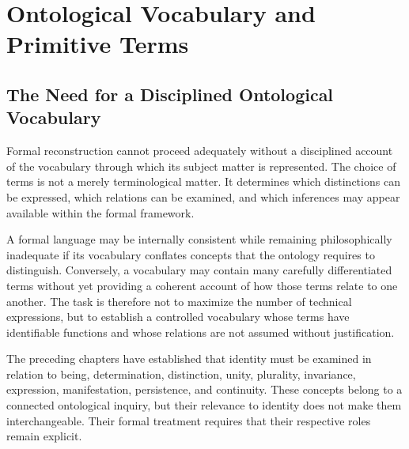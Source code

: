 
\section{Ontological Vocabulary and Primitive Terms}
\label{sec:ch07_s02}

\subsection{The Need for a Disciplined Ontological Vocabulary}

Formal reconstruction cannot proceed adequately without a
disciplined account of the vocabulary through which its subject
matter is represented. The choice of terms is not a merely
terminological matter. It determines which distinctions can be
expressed, which relations can be examined, and which inferences
may appear available within the formal framework.

A formal language may be internally consistent while remaining
philosophically inadequate if its vocabulary conflates concepts
that the ontology requires to distinguish. Conversely, a
vocabulary may contain many carefully differentiated terms
without yet providing a coherent account of how those terms
relate to one another. The task is therefore not to maximize
the number of technical expressions, but to establish a
controlled vocabulary whose terms have identifiable functions
and whose relations are not assumed without justification.

The preceding chapters have established that identity must be
examined in relation to being, determination, distinction,
unity, plurality, invariance, expression, manifestation,
persistence, and continuity. These concepts belong to a
connected ontological inquiry, but their relevance to identity
does not make them interchangeable. Their formal treatment
requires that their respective roles remain explicit.

